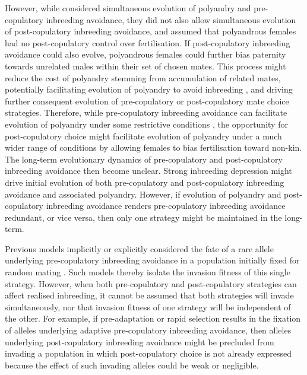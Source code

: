 \documentclass[10pt,letterpaper]{article}
\begin{document}
However, while \cite{Duthie} considered simultaneous evolution of polyandry and pre-copulatory inbreeding avoidance, they did not also allow simultaneous evolution of post-copulatory inbreeding avoidance, and assumed that polyandrous females had no post-copulatory control over fertilisation. If post-copulatory inbreeding avoidance could also evolve, polyandrous females could further bias paternity towards unrelated males within their set of chosen mates. This process might reduce the cost of polyandry stemming from accumulation of related mates, potentially facilitating evolution of polyandry to avoid inbreeding \cite[][]{Zeh1997}, and driving further consequent evolution of pre-copulatory or post-copulatory mate choice strategies. Therefore, while pre-copulatory inbreeding avoidance can facilitate evolution of polyandry under some restrictive conditions \cite[][]{Duthie}, the opportunity for post-copulatory choice might facilitate evolution of polyandry under a much wider range of conditions by allowing females to bias fertilisation toward non-kin. The long-term evolutionary dynamics of pre-copulatory and post-copulatory inbreeding avoidance then become unclear. Strong inbreeding depression might drive initial evolution of both pre-copulatory and post-copulatory inbreeding avoidance and associated polyandry. However, if evolution of polyandry and post-copulatory inbreeding avoidance renders pre-copulatory inbreeding avoidance redundant, or vice versa, then only one strategy might be maintained in the long-term.

Previous models implicitly or explicitly considered the fate of a rare allele underlying pre-copulatory inbreeding avoidance in a population initially fixed for random mating \cite[e.g.,][]{Parker1979, Parker2006, Duthie, Duthie2016a}. Such models thereby isolate the invasion fitness of this single strategy. However, when both pre-copulatory and post-copulatory strategies can affect realised inbreeding, it cannot be assumed that both strategies will invade simultaneously, nor that invasion fitness of one strategy will be independent of the other. For example, if pre-adaptation or rapid selection results in the fixation of alleles underlying adaptive pre-copulatory inbreeding avoidance, then alleles underlying post-copulatory inbreeding avoidance might be precluded from invading a population in which post-copulatory choice is not already expressed because the effect of such invading alleles could be weak or negligible. 
\end{document}
